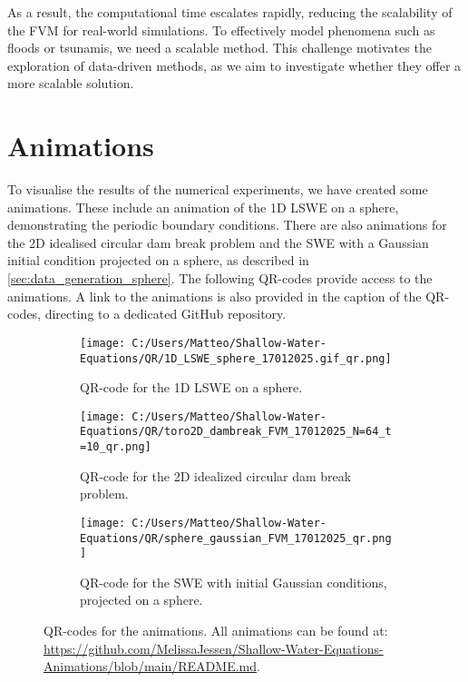 As a result, the computational time escalates rapidly, reducing the scalability of the FVM for real-world simulations.
To effectively model phenomena such as floods or tsunamis, we need a scalable method.
This challenge motivates the exploration of data-driven methods, as we aim to investigate whether they offer a more scalable solution.

\section{Animations}\label{sec:animations}
To visualise the results of the numerical experiments, we have created some animations.
These include an animation of the 1D LSWE on a sphere, demonstrating the periodic boundary conditions.
There are also animations for the 2D idealised circular dam break problem and the SWE with a Gaussian initial condition projected on a sphere, as described in \autoref{sec:data_generation_sphere}.
The following QR-codes provide access to the animations.
A link to the animations is also provided in the caption of the QR-codes, directing to a dedicated GitHub repository.
\begin{figure}[H]
    \centering
    \begin{subfigure}{0.25\textwidth}
        \begin{minipage}[t]{\textwidth}
            \centering
            \texttt{[image: C:/Users/Matteo/Shallow-Water-Equations/QR/1D\_LSWE\_sphere\_17012025.gif\_qr.png]}
            \caption{QR-code for the 1D LSWE on a sphere.}\label{fig:1D_LSWE_sphere_qr}
        \end{minipage}
    \end{subfigure}
    \hspace{1cm}
    \begin{subfigure}{0.25\textwidth}
        \begin{minipage}[t]{\textwidth}
            \centering
            \texttt{[image: C:/Users/Matteo/Shallow-Water-Equations/QR/toro2D\_dambreak\_FVM\_17012025\_N=64\_t=10\_qr.png]}
            \caption{QR-code for the 2D idealized circular dam break problem.}\label{fig:2D_dam_break_qr}
        \end{minipage}
    \end{subfigure}
    \hspace{1cm}
    \begin{subfigure}{0.25\textwidth}
        \begin{minipage}[t]{\textwidth}
            \centering
            \texttt{[image: C:/Users/Matteo/Shallow-Water-Equations/QR/sphere\_gaussian\_FVM\_17012025\_qr.png]}
            \caption{QR-code for the SWE with initial Gaussian conditions, projected on a sphere.}\label{fig:2D_dam_break_qr_part2}
        \end{minipage}
    \end{subfigure}
    \caption{QR-codes for the animations.
            All animations can be found at: \url{https://github.com/MelissaJessen/Shallow-Water-Equations-Animations/blob/main/README.md}.}\label{fig:2D_dam_break_qr_all}
\end{figure}
